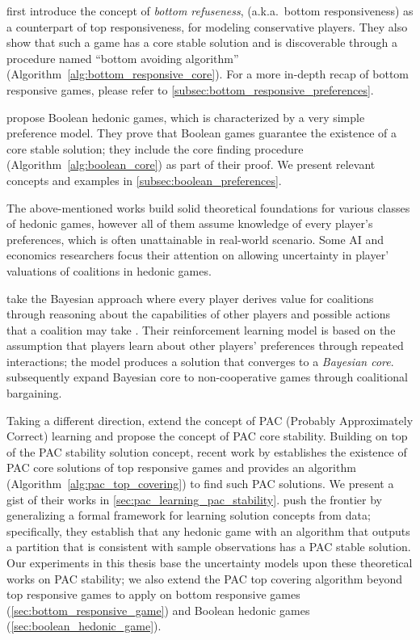  first introduce the concept of \textit{bottom refuseness},
(a.k.a.\ bottom responsiveness) as a counterpart of top responsiveness, for
modeling conservative players.
They also show that such a game has a core stable solution and is discoverable
through a procedure named ``bottom avoiding algorithm''
(Algorithm~\ref{alg:bottom_responsive_core}).
For a more in-depth recap of bottom responsive games, please refer to
\autoref{subsec:bottom_responsive_preferences}.

 propose Boolean hedonic games,
which is characterized by a very simple preference model.
They prove that Boolean games guarantee the existence of a core stable solution;
they include the core finding procedure (Algorithm~\ref{alg:boolean_core}) as
part of their proof.
We present relevant concepts and examples in
\autoref{subsec:boolean_preferences}.

The above-mentioned works build solid theoretical foundations for various
classes of hedonic games, however all of them assume knowledge of every
player's preferences, which is often unattainable in real-world scenario.
Some AI and economics researchers focus their attention on allowing uncertainty
in player' valuations of coalitions in hedonic games.

 take the Bayesian approach where every player derives
value for coalitions through reasoning about the capabilities of other players
and possible actions that a coalition may take
\cite{Chalkiadakis2004, Chalkiadakis:2008:SDM:1402383.1402435}.
Their reinforcement learning model is based on the assumption that players
learn about other players' preferences through repeated interactions; the model
produces a solution that converges to a \textit{Bayesian core}.
 subsequently expand Bayesian core to
non-cooperative games through coalitional bargaining.

Taking a different direction, 
extend the concept of PAC (Probably Approximately Correct) learning and
propose the concept of PAC core stability.
Building on top of the PAC stability solution concept, recent work by
 establishes the existence of PAC core solutions
of top responsive games and provides an algorithm
(Algorithm~\ref{alg:pac_top_covering}) to find such PAC solutions.
We present a gist of their works in \autoref{sec:pac_learning_pac_stability}.
 push the frontier by generalizing a formal
framework for learning solution concepts from data; specifically, they
establish that any hedonic game with an algorithm that outputs a partition
that is consistent with sample observations has a PAC stable solution.
Our experiments in this thesis base the uncertainty models upon these theoretical
works on PAC stability; we also extend the PAC top covering algorithm beyond
top responsive games to apply on bottom responsive games
(\autoref{sec:bottom_responsive_game}) and Boolean hedonic games
 (\autoref{sec:boolean_hedonic_game}).

